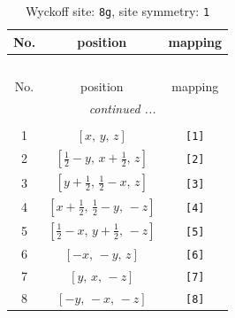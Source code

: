\documentclass[fleqn,8pt]{jsarticle}
\begin{document}
\renewcommand{\arraystretch}{1.2}
\begin{longtable}{ccc}
\caption{Wyckoff site: {\tt 8g}, site symmetry: {\tt 1}}
 \\
 \hline \hline
No. & position & mapping \\ \hline \endfirsthead

\multicolumn{2}{l}{\tablename\ \thetable{}} \\
 \hline \hline
No. & position & mapping \\ \hline \endhead

 \hline \hline
\multicolumn{2}{r}{\footnotesize\it continued ...} \\ \endfoot

 \hline \hline
\multicolumn{2}{r}{} \\ \endlastfoot

1 & $\left[ x,\, y,\, z \right]$ & {\tt [1]} \\ \hline
2 & $\left[ \frac{1}{2} - y,\, x + \frac{1}{2},\, z \right]$ & {\tt [2]} \\ \hline
3 & $\left[ y + \frac{1}{2},\, \frac{1}{2} - x,\, z \right]$ & {\tt [3]} \\ \hline
4 & $\left[ x + \frac{1}{2},\, \frac{1}{2} - y,\, - z \right]$ & {\tt [4]} \\ \hline
5 & $\left[ \frac{1}{2} - x,\, y + \frac{1}{2},\, - z \right]$ & {\tt [5]} \\ \hline
6 & $\left[ - x,\, - y,\, z \right]$ & {\tt [6]} \\ \hline
7 & $\left[ y,\, x,\, - z \right]$ & {\tt [7]} \\ \hline
8 & $\left[ - y,\, - x,\, - z \right]$ & {\tt [8]} \\
\end{longtable}
\end{document}
